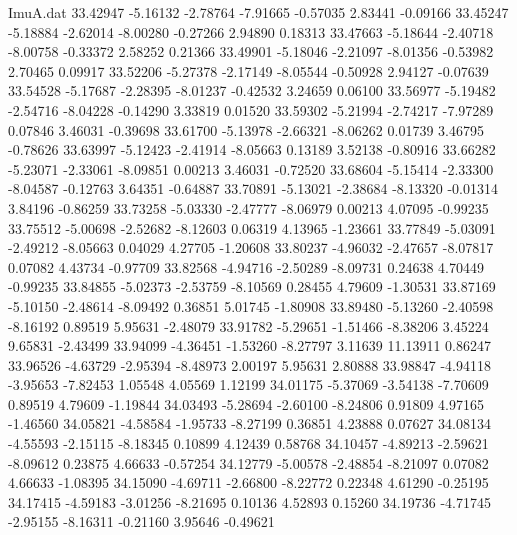 \begin{filecontents}{ImuA.dat}
  33.42947   -5.16132   -2.78764   -7.91665   -0.57035    2.83441   -0.09166
  33.45247   -5.18884   -2.62014   -8.00280   -0.27266    2.94890    0.18313
  33.47663   -5.18644   -2.40718   -8.00758   -0.33372    2.58252    0.21366
  33.49901   -5.18046   -2.21097   -8.01356   -0.53982    2.70465    0.09917
  33.52206   -5.27378   -2.17149   -8.05544   -0.50928    2.94127   -0.07639
  33.54528   -5.17687   -2.28395   -8.01237   -0.42532    3.24659    0.06100
  33.56977   -5.19482   -2.54716   -8.04228   -0.14290    3.33819    0.01520
  33.59302   -5.21994   -2.74217   -7.97289    0.07846    3.46031   -0.39698
  33.61700   -5.13978   -2.66321   -8.06262    0.01739    3.46795   -0.78626
  33.63997   -5.12423   -2.41914   -8.05663    0.13189    3.52138   -0.80916
  33.66282   -5.23071   -2.33061   -8.09851    0.00213    3.46031   -0.72520
  33.68604   -5.15414   -2.33300   -8.04587   -0.12763    3.64351   -0.64887
  33.70891   -5.13021   -2.38684   -8.13320   -0.01314    3.84196   -0.86259
  33.73258   -5.03330   -2.47777   -8.06979    0.00213    4.07095   -0.99235
  33.75512   -5.00698   -2.52682   -8.12603    0.06319    4.13965   -1.23661
  33.77849   -5.03091   -2.49212   -8.05663    0.04029    4.27705   -1.20608
  33.80237   -4.96032   -2.47657   -8.07817    0.07082    4.43734   -0.97709
  33.82568   -4.94716   -2.50289   -8.09731    0.24638    4.70449   -0.99235
  33.84855   -5.02373   -2.53759   -8.10569    0.28455    4.79609   -1.30531
  33.87169   -5.10150   -2.48614   -8.09492    0.36851    5.01745   -1.80908
  33.89480   -5.13260   -2.40598   -8.16192    0.89519    5.95631   -2.48079
  33.91782   -5.29651   -1.51466   -8.38206    3.45224    9.65831   -2.43499
  33.94099   -4.36451   -1.53260   -8.27797    3.11639   11.13911    0.86247
  33.96526   -4.63729   -2.95394   -8.48973    2.00197    5.95631    2.80888
  33.98847   -4.94118   -3.95653   -7.82453    1.05548    4.05569    1.12199
  34.01175   -5.37069   -3.54138   -7.70609    0.89519    4.79609   -1.19844
  34.03493   -5.28694   -2.60100   -8.24806    0.91809    4.97165   -1.46560
  34.05821   -4.58584   -1.95733   -8.27199    0.36851    4.23888    0.07627
  34.08134   -4.55593   -2.15115   -8.18345    0.10899    4.12439    0.58768
  34.10457   -4.89213   -2.59621   -8.09612    0.23875    4.66633   -0.57254
  34.12779   -5.00578   -2.48854   -8.21097    0.07082    4.66633   -1.08395
  34.15090   -4.69711   -2.66800   -8.22772    0.22348    4.61290   -0.25195
  34.17415   -4.59183   -3.01256   -8.21695    0.10136    4.52893    0.15260
  34.19736   -4.71745   -2.95155   -8.16311   -0.21160    3.95646   -0.49621

\end{filecontents}
